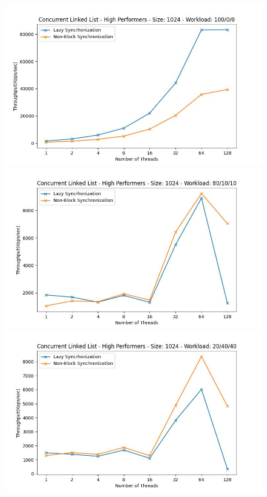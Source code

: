 \documentclass[../final_report.tex]{subfiles}
\begin{document}
\begin{figure}[H]
    \centering
        \includegraphics[scale=0.4]{outFiles/plots/concurrent_data_structs_high_1024_100_0_0.jpg}
        \includegraphics[scale=0.4]{outFiles/plots/concurrent_data_structs_high_1024_80_10_10.jpg}
        \includegraphics[scale=0.4]{outFiles/plots/concurrent_data_structs_high_1024_20_40_40.jpg}

\end{figure}
\end{document}
